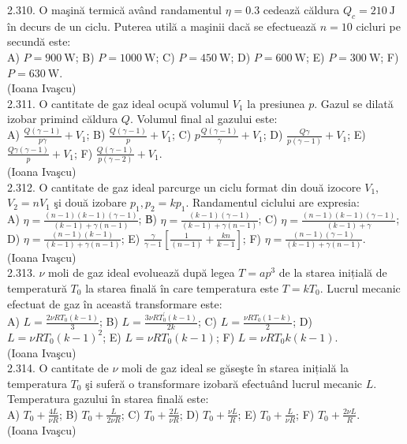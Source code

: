 2.310. O maşină termică având randamentul $\eta=0.3$ cedează căldura $Q_{c}=210 \mathrm{~J}$ în decurs de un ciclu. Puterea utilă a maşinii dacă se efectuează $n=10$ cicluri pe secundă este:\\ A) $P=900 \mathrm{~W}$; B) $P=1000 \mathrm{~W}$; C) $P=450 \mathrm{~W}$; D) $P=600 \mathrm{~W}$; E) $P=300 \mathrm{~W}$; F) $P=630 \mathrm{~W}$.\\ (Ioana Ivaşcu)\\

2.311. O cantitate de gaz ideal ocupă volumul $V_{1}$ la presiunea $p$. Gazul se dilată izobar primind căldura $Q$. Volumul final al gazului este:\\ A) $\frac{Q(\gamma-1)}{p \gamma}+V_{1}$; B) $\frac{Q(\gamma-1)}{p}+V_{1}$; C) $p \frac{Q(\gamma-1)}{\gamma}+V_{1}$; D) $\frac{Q \gamma}{p(\gamma-1)}+V_{1}$; E) $\frac{Q \gamma(\gamma-1)}{p}+V_{1}$; F) $\frac{Q(\gamma-1)}{p(\gamma-2)}+V_{1}$.\\ (Ioana Ivaşcu)\\

2.312. O cantitate de gaz ideal parcurge un ciclu format din două izocore $V_{1}$, $V_{2}=n V_{1}$ şi două izobare $p_{1}, p_{2}=k p_{1}$. Randamentul ciclului are expresia:\\ A) $\eta=\frac{(n-1)(k-1)(\gamma-1)}{(k-1)+\gamma(n-1)}$; В) $\eta=\frac{(k-1)(\gamma-1)}{(k-1)+\gamma(n-1)}$; C) $\eta=\frac{(n-1)(k-1)(\gamma-1)}{(k-1)+\gamma}$; D) $\eta=\frac{(n-1)(k-1)}{(k-1)+\gamma(n-1)}$; E) $\frac{\gamma}{\gamma-1}\left[\frac{1}{(n-1)}+\frac{k n}{k-1}\right]$; F) $\eta=\frac{(n-1)(\gamma-1)}{(k-1)+\gamma(n-1)}$.\\ (Ioana Ivaşcu)\\

2.313. $\nu$ moli de gaz ideal evoluează după legea $T=a p^{3}$ de la starea inițială de temperatură $T_{0}$ la starea finală în care temperatura este $T=k T_{0}$. Lucrul mecanic efectuat de gaz în această transformare este:\\ A) $L=\frac{2 \nu R T_{0}(k-1)}{3}$; B) $L=\frac{3 \nu R T_{0}^{\prime}(k-1)}{2 k}$; C) $L=\frac{\nu R T_{0}(1-k)}{2}$; D) $L=\nu R T_{0}(k-1)^{2}$; E) $L=\nu R T_{0}(k-1)$; F) $L=\nu R T_{0} k(k-1)$.\\ (Ioana Ivaşcu)\\

2.314. O cantitate de $\nu$ moli de gaz ideal se găseşte în starea inițială la temperatura $T_{0}$ şi suferă o transformare izobară efectuând lucrul mecanic $L$. Temperatura gazului în starea finală este:\\ A) $T_{0}+\frac{4 L}{\nu R}$; B) $T_{0}+\frac{L}{2 \nu R}$; C) $T_{0}+\frac{2 L}{\nu R}$; D) $T_{0}+\frac{\nu L}{R}$; E) $T_{0}+\frac{L}{\nu R}$; F) $T_{0}+\frac{2 \nu L}{R}$.\\ (Ioana Ivaşcu)\\


